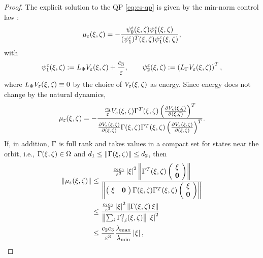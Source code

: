 \begin{proof}
  The explicit solution to the QP \eqref{eq:es-qp} is given by the min-norm
  control law \cite{Freeman1996}:
  \begin{align*}
    \mu_{\varepsilon}(\xi, \zeta) = -\frac{\psi^{\varepsilon}_{0}(\xi, \zeta)
      \psi^{\varepsilon}_{1}(\xi, \zeta)}{(\psi^{\varepsilon}_{1})^{T}(\xi, \zeta) \psi^{\varepsilon}_{1}(\xi, \zeta)},
  \end{align*}
  with
  \begin{align*}
    \psi^{\varepsilon}_{1}(\xi, \zeta) := L_{\Phi} V_{\varepsilon}(\xi, \zeta) + \frac{c_{3}}{\varepsilon},
    \qquad \psi^{\varepsilon}_{2}(\xi, \zeta) := \left( L_{\Gamma} V_{\varepsilon}(\xi, \zeta) \right)^{T},
  \end{align*}
  where $L_{\Phi} V_{\varepsilon}(\xi, \zeta) \equiv 0$ by the choice of $V_{\varepsilon}(\xi, \zeta)$ as
  energy.
  Since energy does not change by the natural dynamics,
  \begin{align*}
    \mu_{\varepsilon}(\xi, \zeta) = - \frac{\frac{c_{3}}{\varepsilon} V_{\varepsilon}(\xi, \zeta)
      \Gamma^{T}(\xi, \zeta) \left( \frac{\partial{V_{e}(\xi, \zeta)}}{\partial{(\xi, \zeta)}}
      \right)^{T}}{\frac{\partial{V_{e}(\xi, \zeta)}}{\partial{(\xi, \zeta)}} \Gamma(\xi, \zeta) \Gamma^{T}(\xi, \zeta)
      \left( \frac{\partial{V_{e}(\xi, \zeta)}}{\partial{(\xi, \zeta)}} \right)^{T}}.
  \end{align*}
  If, in addition, $\Gamma$ is full rank and takes values in a compact set for
  states near the orbit, i.e., $\Gamma(\xi, \zeta) \in \Omega$ and $d_{1} \leq \|
  \Gamma(\xi, \zeta) \| \leq d_{2}$, then
  \begin{align}
    \nonumber
    \| \mu_{\varepsilon}(\xi, \zeta) \|
    &\leq \frac{\frac{c_{2}c_{3}}{\varepsilon^3} \left|\xi\right|^{2} \left\| \Gamma^{T}(\xi, \zeta)
      \left(\!\begin{array}{c}
      \xi\\
      {\mathbf 0}
      \end{array}\!\right)\right\|}{\left\|
      \left(\!\begin{array}{c c}
      \xi & {\mathbf 0}
      \end{array}\!\right) \Gamma(\xi, \zeta) \Gamma^{T}(\xi, \zeta)
      \left(\!\begin{array}{c}
      \xi\\
      {\mathbf 0}
      \end{array}\!\right) \right\|}\\
    \nonumber
    &\leq \frac{\frac{c_{2}c_{3}}{\varepsilon^{3}} \left|\xi\right|^{2} \left\| \Gamma(\xi, \zeta)
      \, \xi \right\|}{\left\|
      \sum_{i} \Gamma_{i,i}^{2}(\xi, \zeta) \right\| \left|\xi\right|^{2}}\\
    \label{eq:mueps-bounds}
    &\leq \frac{c_{2}c_{3}}{\varepsilon^{3}} \frac{\lambda_{\mathrm{max}}}{\lambda_{\mathrm{min}}}
    \left|\xi\right|,
  \end{align}

\end{proof}
